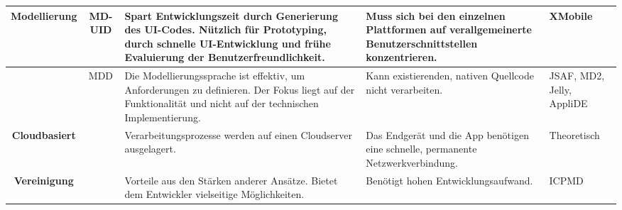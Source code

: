 \begin{table}[htbp]
{\begin{tabular}{|c|c|p{5cm}|p{6cm}|p{}|}
			\textbf{Modellierung}                  & MD-UID                                      & Spart Entwicklungszeit durch Generierung des UI-Codes. Nützlich für Prototyping, durch schnelle UI-Entwicklung und frühe Evaluierung der Benutzerfreundlichkeit.                                                                                                                                                         & Muss sich bei den einzelnen Plattformen auf verallgemeinerte Benutzerschnittstellen konzentrieren.                                                                                                             &  XMobile                                                                                                                                            \\ \hline
			\textbf{}                              & MDD                                         & Die Modellierungssprache ist effektiv, um Anforderungen zu definieren. Der Fokus liegt auf der Funktionalität und nicht auf der technischen Implementierung.                                                                                                                                                                      & Kann existierenden, nativen Quellcode nicht verarbeiten.                                                                                                                                               & JSAF, MD2, Jelly, AppliDE                                                                             \\ \hline
			\textbf{Cloudbasiert}                 &                                             & Verarbeitungsprozesse werden auf einen Cloudserver ausgelagert.                                                                                                                                                                                                                                                                          & Das Endgerät und die App benötigen eine schnelle, permanente Netzwerkverbindung.                                                                                                                       &  Theoretisch                                                                                                                                         \\ \hline
			\textbf{Vereinigung}                   &                                             & Vorteile aus den Stärken anderer Ansätze. Bietet dem Entwickler vielseitige Möglichkeiten.                                                                                                                                                                                                                                       & Benötigt hohen Entwicklungsaufwand.                                                                                                                                                                    &  ICPMD                                                                                                                                             \\ \hline

\end{tabular}}
\end{table}
